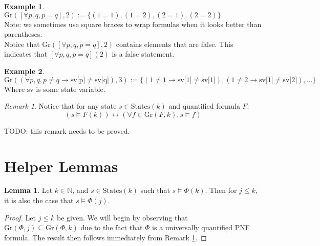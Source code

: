 \documentclass[12pt]{article}
\theoremstyle{definition}
\newtheorem{lemma}{Lemma}
\newtheorem{example}{Example}
\theoremstyle{remark}
\newtheorem{remark}{Remark}
\newcommand{\states}{\text{States}}
\newcommand{\gr}{\text{Gr}}
\begin{document}
\begin{example}
  $\gr([\forall p,q, p=q],2) := \{(1=1),(1=2),(2=1),(2=2)\}$\\
  Note: we sometimes use square braces to wrap formulas when it looks better than parentheses.\\
  Notice that $\gr([\forall p,q, p=q],2)$ contains elements that are false.  This indicates that $[\forall p,q, p=q](2)$ is a false statement.
\end{example}
\begin{example}
  $\gr((\forall p,q, p \neq q \rightarrow \text{sv[p]} \neq \text{sv[q]}),3) := \{(1 \neq 1 \rightarrow \text{sv[1]} \neq \text{sv[1]}),(1 \neq 2 \rightarrow \text{sv[1]} \neq \text{sv[2]}),...\}$
  Where $\text{sv}$ is some state variable.
\end{example}
\begin{remark}
  \label{rmk:pnf-ground}
  Notice that for any state $s \in \states(k)$ and quantified formula $F$:
  $$(s \models F(k)) \leftrightarrow (\forall f \in \gr(F,k), s \models f)$$
\end{remark}
TODO: this remark needs to be proved.



\section{Helper Lemmas}

\begin{lemma}
  \label{lem:lt-sat}
  Let $k \in \mathbb{N}$, and $s \in \states(k)$ such that $s \models \Phi(k)$.  Then for $j \leq k$, it is also the case that $s \models \Phi(j)$.
\end{lemma}
\begin{proof}
  Let $j \leq k$ be given.  We will begin by observing that $\gr(\Phi,j) \subseteq \gr(\Phi,k)$ due to the fact that $\Phi$ is a universally quantified PNF formula.  The result then follows immediately from Remark \ref{rmk:pnf-ground}.  
\end{proof}
\end{document}

